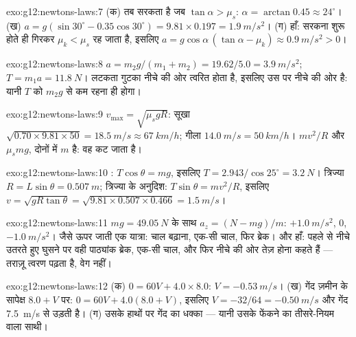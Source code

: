 \begin{solution}{exo:g12:newtons-laws:7}
(क) तब सरकता है जब $\tan\alpha > \mu_s$: $\alpha = \arctan 0.45 \approx
24^\circ$। (ख) $a = g(\sin 30^\circ - 0.35\cos 30^\circ) =
9.81 \times 0.197 = \qty{1.9}{m/s^2}$। (ग) हाँ: सरकना शुरू होते ही
 गिरकर $\mu_k < \mu_s$ रह जाता है, इसलिए $a = g\cos\alpha\,(\tan\alpha - \mu_k) \approx \qty{0.9}{m/s^2} > 0$।
\end{solution}

\begin{solution}{exo:g12:newtons-laws:8}
$a = m_2 g/(m_1 + m_2) = 19.62/5.0 = \qty{3.9}{m/s^2}$; $T = m_1 a = \qty{11.8}{N}$। लटकता गुटका नीचे की ओर त्वरित होता है, इसलिए उस पर
 नीचे की ओर है: यानी $T$ को $m_2 g$ से कम रहना ही होगा।
\end{solution}

\begin{solution}{exo:g12:newtons-laws:9}
$v_{\max} = \sqrt{\mu_s g R}$: सूखा $\sqrt{0.70 \times 9.81 \times 50} = \qty{18.5}{m/s} \approx
\qty{67}{km/h}$; गीला $\qty{14.0}{m/s} = \qty{50}{km/h}$। $mv^2/R$ और $\mu_s mg$, दोनों में $m$ है: वह
कट जाता है।
\end{solution}

\begin{solution}{exo:g12:newtons-laws:10}
: $T\cos\theta = mg$, इसलिए $T = 2.943/\cos 25^\circ = \qty{3.2}{N}$। त्रिज्या $R = L\sin\theta =
\qty{0.507}{m}$; त्रिज्या के अनुदिश: $T\sin\theta = mv^2/R$,
इसलिए $v = \sqrt{gR\tan\theta} = \sqrt{9.81 \times 0.507 \times 0.466}
= \qty{1.5}{m/s}$।
\end{solution}

\begin{solution}{exo:g12:newtons-laws:11}
$mg = \qty{49.05}{N}$ के साथ $a_z = (N - mg)/m$: $+\qty{1.0}{m/s^2}$, $0$, $-\qty{1.0}{m/s^2}$। जैसे ऊपर जाती एक यात्रा: चाल
बढ़ाना, एक-सी चाल, फिर ब्रेक। और हाँ: पहले से नीचे उतरते हुए घुसने पर वही
पाठ्यांक ब्रेक, एक-सी चाल, और फिर नीचे की ओर तेज़ होना कहते हैं --- तराज़ू
त्वरण पढ़ता है, वेग नहीं।
\end{solution}

\begin{solution}{exo:g12:newtons-laws:12}
(क) $0 = 60V + 4.0 \times 8.0$: $V = \qty{-0.53}{m/s}$। (ख) गेंद ज़मीन के सापेक्ष $8.0 + V$ पर: $0 = 60V + 4.0(8.0 + V)$, इसलिए $V = -32/64 = \qty{-0.50}{m/s}$
और गेंद \qty{7.5}{m/s} से उड़ती है। (ग) उसके हाथों पर गेंद का धक्का --- यानी उसके फेंकने
का तीसरे-नियम वाला साथी।
\end{solution}

